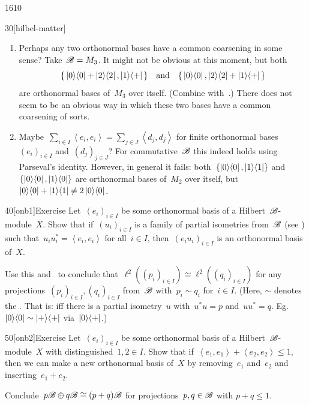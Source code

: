 \begin{parsec}{1610}
\begin{point}{30}[hilbel-matter]
\begin{enumerate}
\item
Perhaps any two orthonormal bases have a common coarsening in some sense?
Take~$\mathscr{B} = M_3$.
It might not be obvious at this moment, but both
\begin{equation*}
    \{\,\left|0\right>\!\left<0\right| + \left|2\right>\!\left<2\right|, \left|1\right>\!\left<+\right|\,\}
    \quad \text{and} \quad
    \{\,\left|0\right>\!\left<0\right|, \left|2\right>\!\left<2\right|+ \left|1\right>\!\left<+\right|\,\}
\end{equation*}
are orthonormal bases of~$M_3$ over itself.
(Combine  with~.)
There does not seem to be an obvious way in which these
    two bases have a common coarsening of sorts.

\item
Maybe~$\sum_{i\in I} \left<e_i,e_i\right> = \sum_{j\in J} \left<d_j,d_j\right>$
    for finite orthonormal bases~$(e_i)_{i \in I}$ and~$(d_j)_{j \in J}$?
For commutative~$\mathscr{B}$ this indeed holds using Parseval's identity.
However, in general it fails:
        both~$\{\left|0\right>\!\left<0\right|, \left|1\right>\!\left<1\right|\}$ and
        $\{\left|0\right>\!\left<0\right|, \left|1\right>\!\left<0\right| \}$
        are orthonormal bases of~$M_2$ over itself,
    but~$\left|0\right>\!\left<0\right|+ \left|1\right>\!\left<1\right| \neq 2 \left|0\right>\!\left<0\right|$.
\end{enumerate}
\spacingfix{}
\end{point}
\begin{point}{40}[onb1]{Exercise}%
Let~$(e_i)_{ i \in I}$ be some orthonormal basis of a Hilbert~$\mathscr{B}$-module~$X$.
Show that if~$(u_i)_{i \in I}$
    is a family of partial isometries
    from~$\mathscr{B}$
    (see )
    such that~$u_iu_i^* = \left<e_i,e_i\right>$
    for all~$i \in I$,
    then~$(e_iu_i)_{i \in I}$
    is an orthonormal basis of~$X$.

Use this and~ to conclude
    that~$\ell^2((p_i)_{i \in I}) \cong \ell^2((q_i)_{i \in I})$
    for any projections~$(p_i)_{i\in I}, (q_i)_{i\in I} $
    from~$\mathscr{B}$
    with~$p_i \sim q_i$ for~$i \in I$.
    (Here, $\sim$ denotes the .
    That is:  iff there is a partial isometry~$u$
    with~$u^*u = p$ and~$uu^*=q$.
    Eg.~$\left|0\right>\!\left<0\right| \sim \left|+\right>\!\left<+\right|$
        via~$\left|0\right>\!\left<+\right|$.)
\end{point}

\begin{point}{50}[onb2]{Exercise}%
Let~$(e_i)_{ i \in I}$ be some orthonormal basis of a Hilbert~$\mathscr{B}$-module~$X$
    with distinguished~$1,2 \in I$.
Show that if~$\left<e_1,e_1\right> + \left<e_2,e_2\right> \leq 1$,
    then we can make a new orthonormal basis of~$X$ by  removing~$e_1$ and~$e_2$
        and inserting~$e_1 + e_2$.

Conclude~$p \mathscr{B} \oplus q \mathscr{B} \cong (p+q) \mathscr{B}$
    for projections~$p,q \in \mathscr{B}$ with $p+q \leq 1$.
\end{point}
\end{parsec}
